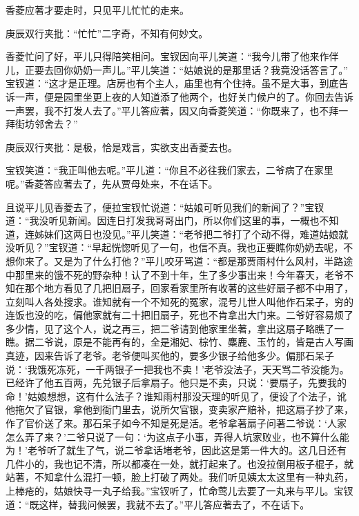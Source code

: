 \begin{parag}


    香菱应著才要走时，只见平儿忙忙的走来。\begin{note}庚辰双行夹批：“忙忙”二字奇，不知有何妙文。\end{note}香菱忙问了好，平儿只得陪笑相问。宝钗因向平儿笑道：“我今儿带了他来作伴儿，正要去回你奶奶一声儿。”平儿笑道：“姑娘说的是那里话？我竟没话答言了。” 宝钗道：“这才是正理。店房也有个主人，庙里也有个住持。虽不是大事，到底告诉一声，便是园里坐更上夜的人知道添了他两个，也好关门候户的了。你回去告诉一声罢，我不打发人去了。”平儿答应著，因又向香菱笑道：“你既来了，也不拜一拜街坊邻舍去？”\begin{note}庚辰双行夹批：是极，恰是戏言，实欲支出香菱去也。\end{note}宝钗笑道：“我正叫他去呢。”平儿道：“你且不必往我们家去，二爷病了在家里呢。”香菱答应著去了，先从贾母处来，不在话下。
\end{parag}


\begin{parag}


    且说平儿见香菱去了，便拉宝钗忙说道：“姑娘可听见我们的新闻了？”宝钗道：“我没听见新闻。因连日打发我哥哥出门，所以你们这里的事，一概也不知道，连姊妹们这两日也没见。”平儿笑道：“老爷把二爷打了个动不得，难道姑娘就没听见？”宝钗道：“早起恍惚听见了一句，也信不真。我也正要瞧你奶奶去呢，不想你来了。又是为了什么打他？”平儿咬牙骂道：“都是那贾雨村什么风村，半路途中那里来的饿不死的野杂种！认了不到十年，生了多少事出来！今年春天，老爷不知在那个地方看见了几把旧扇子，回家看家里所有收著的这些好扇子都不中用了，立刻叫人各处搜求。谁知就有一个不知死的冤家，混号儿世人叫他作石呆子，穷的连饭也没的吃，偏他家就有二十把旧扇子，死也不肯拿出大门来。二爷好容易烦了多少情，见了这个人，说之再三，把二爷请到他家里坐著，拿出这扇子略瞧了一瞧。据二爷说，原是不能再有的，全是湘妃、棕竹、麋鹿、玉竹的，皆是古人写画真迹，因来告诉了老爷。老爷便叫买他的，要多少银子给他多少。偏那石呆子说：‘我饿死冻死，一千两银子一把我也不卖！’老爷没法子，天天骂二爷没能为。已经许了他五百两，先兑银子后拿扇子。他只是不卖，只说：‘要扇子，先要我的命！’姑娘想想，这有什么法子？谁知雨村那没天理的听见了，便设了个法子，讹他拖欠了官银，拿他到衙门里去，说所欠官银，变卖家产赔补，把这扇子抄了来，作了官价送了来。那石呆子如今不知是死是活。老爷拿著扇子问著二爷说：‘人家怎么弄了来？’二爷只说了一句：‘为这点子小事，弄得人坑家败业，也不算什么能为！’老爷听了就生了气，说二爷拿话堵老爷，因此这是第一件大的。这几日还有几件小的，我也记不清，所以都凑在一处，就打起来了。也没拉倒用板子棍子，就站著，不知拿什么混打一顿，脸上打破了两处。我们听见姨太太这里有一种丸药，上棒疮的，姑娘快寻一丸子给我。”宝钗听了，忙命莺儿去要了一丸来与平儿。宝钗道：“既这样，替我问候罢，我就不去了。”平儿答应著去了，不在话下。
\end{parag}



